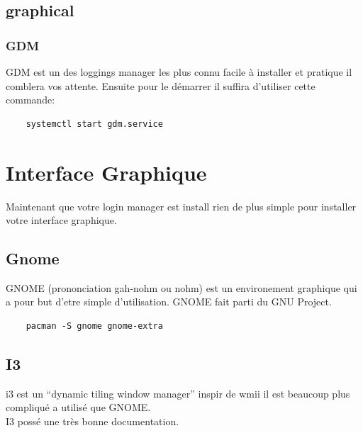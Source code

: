 \documentclass[a4paper]{book}
\begin{document}
  \section{graphical}
  \subsection{GDM}
  GDM est un des loggings manager les plus connu facile à installer et pratique
  il comblera vos attente.
  Ensuite pour le démarrer il suffira d'utiliser cette commande\@:\\
  \begin{lstlisting}
    systemctl start gdm.service
  \end{lstlisting}
  \chapter{Interface Graphique}
  Maintenant que votre login manager est install rien de plus simple pour
  installer votre interface graphique.
  \section{Gnome}
   GNOME (prononciation gah-nohm ou nohm) est un environement graphique qui a
   pour but d'etre simple d'utilisation. GNOME fait parti du GNU Project.
  \begin{lstlisting}
    pacman -S gnome gnome-extra
  \end{lstlisting}
  \section{I3}
  i3 est un ``dynamic tiling window manager'' inspir de wmii il est beaucoup
  plus compliqu\'e a utilis\'e que GNOME.\\
  I3 poss\'e une très bonne documentation.%

  
\end{document}
